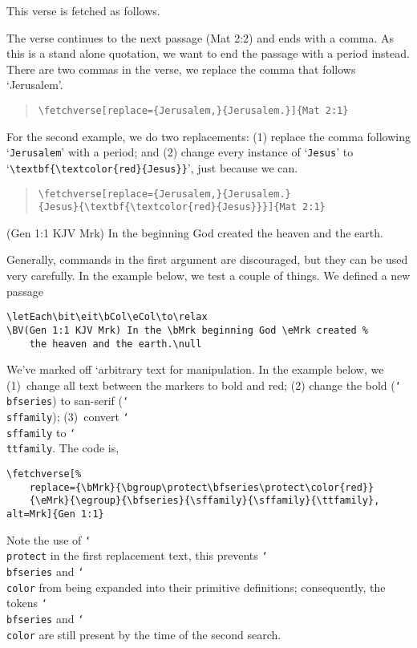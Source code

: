 \documentclass{article}
\providecommand\cs[1]{\texttt{\char`\\#1}}
\begin{document}
This verse is fetched as follows.
\begin{quote}
\end{quote}
The verse continues to the next passage (Mat 2:2) and ends with a comma. As
this is a stand alone quotation, we want to end the passage with a period
instead. There are two commas in the verse, we replace the comma that follows
`Jerusalem'.
\begin{quote}
\verb|\fetchverse[replace={Jerusalem,}{Jerusalem.}]{Mat 2:1}|\\[3pt]
\end{quote}
For the second example, we do two replacements: (1) replace the comma
following `\texttt{Jerusalem}' with a period; and (2) change every instance
of `\texttt{Jesus}' to `\verb|\textbf{\textcolor{red}{Jesus}}|', just because
we can.
\begin{quote}
\verb|\fetchverse[replace={Jerusalem,}{Jerusalem.}|\\
\null\hskip20pt\verb|{Jesus}{\textbf{\textcolor{red}{Jesus}}}]{Mat 2:1}|\\[3pt]
\end{quote}
\let\bMrk\relax\let\eMrk\relax
\begin{declareBVs}
\BV(Gen 1:1 KJV Mrk)  In the \bMrk beginning God \eMrk %
created the heaven and the earth.\null
\end{declareBVs}
Generally, commands in the first argument are discouraged, but they can be
used very carefully. In the example below, we test a couple of things. We
defined a new passage
\begin{verbatim}
\letEach\bit\eit\bCol\eCol\to\relax
\BV(Gen 1:1 KJV Mrk) In the \bMrk beginning God \eMrk created %
    the heaven and the earth.\null
\end{verbatim}
We've marked off `arbitrary text for manipulation. In the example below, we
(1)~change all text between the markers to bold and red; (2) change the bold
(\cs{bfseries}) to san-serif (\cs{sffamily}); (3)~convert \cs{sffamily} to
\cs{ttfamily}. The code is,
\begin{verbatim}
\fetchverse[%
    replace={\bMrk}{\bgroup\protect\bfseries\protect\color{red}}
    {\eMrk}{\egroup}{\bfseries}{\sffamily}{\sffamily}{\ttfamily},
alt=Mrk]{Gen 1:1}
\end{verbatim}
Note the use of \cs{protect} in the first replacement text, this prevents \cs{bfseries}
and \cs{color} from being expanded into their primitive definitions; consequently, the
tokens \cs{bfseries} and \cs{color} are still present by the time of the second search.
\end{document}
